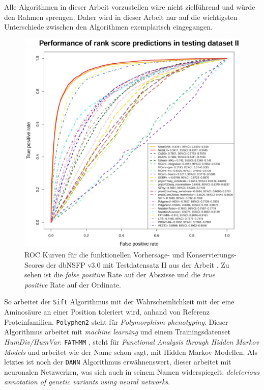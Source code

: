 Alle Algorithmen in dieser Arbeit vorzustellen wäre nicht zielführend und würde den Rahmen sprengen. Daher wird in dieser Arbeit nur auf die wichtigsten Unterschiede zwischen den Algorithmen exemplarisch eingegangen. 

\begin{figure}
\centering
\includegraphics[width=.95\textwidth]{images/compared_prediction_scores.png}
\caption{\ac{ROC} Kurven für die funktionellen Vorhersage- und Konservierungs- Scores der dbNSFP v3.0 mit Testdatensatz II aus der Arbeit \cite{Liu.2016}. Zu sehen ist die \emph{false positive} Rate auf der Abszisse und die \emph{true positive} Rate auf der Ordinate.}
\label{fig:comp_scores}
\end{figure}

So arbeitet der \texttt{Sift} \cite{Vaser.2016} Algorithmus mit der Wahrscheinlichkeit mit der eine Aminosäure an einer Position toleriert wird, anhand von Referenz Proteinfamilien. \texttt{Polyphen2} \cite{Adzhubei.2013} steht für \emph{Polymorphism phenotyping}. Dieser Algorithmus arbeitet mit \emph{machine learning} und einem Trainingsdatenset \emph{HumDiv/HumVar}. \texttt{FATHMM} \cite{Shihab.2013}, steht für \emph{Functional Analysis through Hidden Markov Models} und arbeitet wie der Name schon sagt, mit Hidden Markov Modellen. Als letztes ist noch der \texttt{DANN} \cite{Quang.2015} Algorithmus erwähnenswert, dieser arbeitet mit neuronalen Netzwerken, was sich auch in seinem Namen widerspiegelt: \emph{deleterious annotation of genetic variants using neural networks}.

